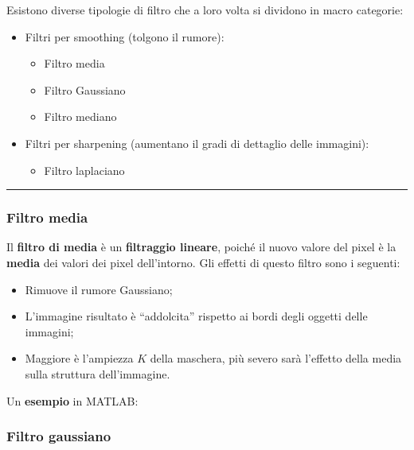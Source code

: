 \documentclass[a4paper]{article}
\newcommand{\dquotes}[1]{``#1''}
\newcommand{\longline}{\noindent\rule{\textwidth}{0.4pt}}
\begin{document}
	Esistono diverse tipologie di filtro che a loro volta si dividono in macro categorie:
	\begin{itemize}
		\item Filtri per smoothing (tolgono il rumore):
		\begin{itemize}
			\item Filtro media
			
			\item Filtro Gaussiano
			
			\item Filtro mediano
		\end{itemize}
		
		\item Filtri per sharpening (aumentano il gradi di dettaglio delle immagini):
		\begin{itemize}
			\item Filtro laplaciano
		\end{itemize}
	\end{itemize}
	
	\longline
	
	\subsubsection{Filtro media}
	
	Il \textcolor{Red3}{\textbf{filtro di media}} è un \textbf{filtraggio lineare}, poiché il nuovo valore del pixel è la \textbf{media} dei valori dei pixel dell'intorno. Gli effetti di questo filtro sono i seguenti:
	\begin{itemize}
		\item Rimuove il rumore Gaussiano;
		
		\item L'immagine risultato è \dquotes{addolcita} rispetto ai bordi degli oggetti delle immagini;
		
		\item Maggiore è l'ampiezza $K$ della maschera, più severo sarà l'effetto della media sulla struttura dell'immagine.
	\end{itemize}
	Un \textcolor{Green4}{\textbf{esempio}} in MATLAB:
	\newpage
	
	\subsubsection{Filtro gaussiano}
	
\end{document}
